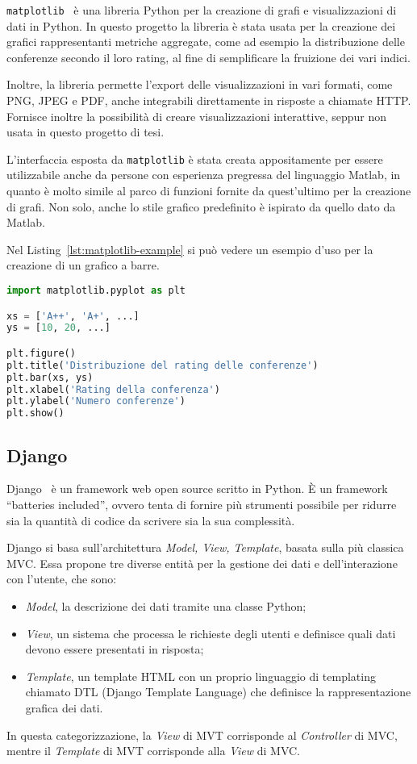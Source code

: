 \texttt{matplotlib}~\cite{matplotlib} è una libreria Python per la creazione
di grafi e visualizzazioni di dati in Python. In questo progetto la libreria
è stata usata per la creazione dei grafici rappresentanti metriche aggregate,
come ad esempio la distribuzione delle conferenze secondo il loro rating, 
al fine di semplificare la fruizione dei vari indici.

Inoltre, la libreria permette l'export delle visualizzazioni in vari formati,
come PNG, JPEG e PDF, anche integrabili direttamente in risposte a chiamate HTTP.
Fornisce inoltre la possibilità di creare visualizzazioni interattive, seppur
non usata in questo progetto di tesi.

L'interfaccia esposta da \texttt{matplotlib} è stata creata appositamente per
essere utilizzabile anche da persone con esperienza pregressa del linguaggio
Matlab, in quanto è molto simile al parco di funzioni fornite da quest'ultimo
per la creazione di grafi. Non solo, anche lo stile grafico predefinito è
ispirato da quello dato da Matlab.

Nel Listing~\ref{lst:matplotlib-example} si può vedere un esempio d'uso per
la creazione di un grafico a barre.

\begin{lstlisting}[float, language=Python, caption=Esempio d'uso di \texttt{matplotlib}, label=lst:matplotlib-example]
import matplotlib.pyplot as plt

xs = ['A++', 'A+', ...]
ys = [10, 20, ...]

plt.figure()
plt.title('Distribuzione del rating delle conferenze')
plt.bar(xs, ys)
plt.xlabel('Rating della conferenza')
plt.ylabel('Numero conferenze')
plt.show()
\end{lstlisting}


\subsection{Django}\label{sec:django}

Django~\cite{django} è un framework web open source scritto in Python. È
un framework ``batteries included'', ovvero tenta di fornire più strumenti
possibile per ridurre sia la quantità di codice da scrivere sia la sua
complessità.

Django si basa sull'architettura \textit{Model, View, Template}, basata sulla più
classica MVC. Essa propone tre diverse entità per la gestione dei dati e dell'interazione
con l'utente, che sono:
\begin{itemize}
	\item \textit{Model}, la descrizione dei dati tramite una classe Python;
	\item \textit{View}, un sistema che processa le richieste degli utenti e
	definisce quali dati devono essere presentati in risposta;
	\item \textit{Template}, un template HTML con un proprio linguaggio di templating
	chiamato DTL (Django Template Language) che definisce la rappresentazione
	grafica dei dati.
\end{itemize}
In questa categorizzazione, la \textit{View} di MVT corrisponde al \textit{Controller}
di MVC, mentre il \textit{Template} di MVT corrisponde alla \textit{View} di MVC.

